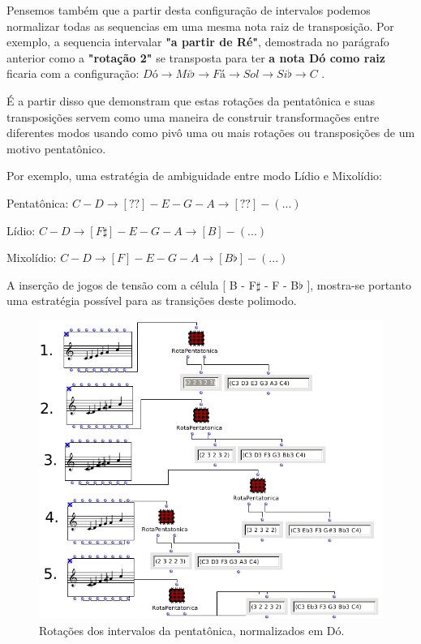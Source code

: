 \documentclass[
	12pt,				%
	openright,			%
	twoside,			%
	a4paper,			%
	english,			%
	french,				%
	spanish,			%
	brazil				%
	]{abntex2}
\begin{document}
Pensemos também que a partir desta configuração de intervalos podemos normalizar todas as sequencias em uma mesma nota raiz de transposição. Por exemplo, a sequencia intervalar \textbf{"a partir de Ré"}, demostrada no parágrafo anterior como a \textbf{"rotação 2"} se transposta para ter \textbf{a nota Dó como raiz} ficaria com a configuração: $Dó \rightarrow Mi\flat \rightarrow Fá \rightarrow Sol \rightarrow Si\flat \rightarrow C $ .

É a partir disso que  demonstram que estas rotações da pentatônica e suas transposições servem como uma maneira de construir transformações entre diferentes modos usando como pivô uma ou mais rotações ou transposições de um motivo pentatônico. 


Por exemplo, uma estratégia de ambiguidade entre modo Lídio e Mixolídio:

Pentatônica: $ C - D \rightarrow [ ?? ] - E - G - A \rightarrow [ ?? ] - (...) $ 

Lídio: $ C - D \rightarrow [ F\sharp ] - E - G - A \rightarrow [ B ] - (...) $  

Mixolídio: $ C - D \rightarrow [ F ] - E - G - A \rightarrow [ B\flat ] - (...) $  


A inserção de jogos de tensão com a célula [ B - F$\sharp$ - F - B$\flat$ ], mostra-se portanto uma estratégia possível para as transições deste polimodo.

\begin{figure}[!h]
	\caption{\label{fig_grafico}Rotações dos intervalos da pentatônica, normalizados em Dó. }
	\begin{center}
	    \includegraphics[scale=0.6]{OM_settheory/pentarotacoes.png}
	\end{center}
\end{figure}
\end{document}
